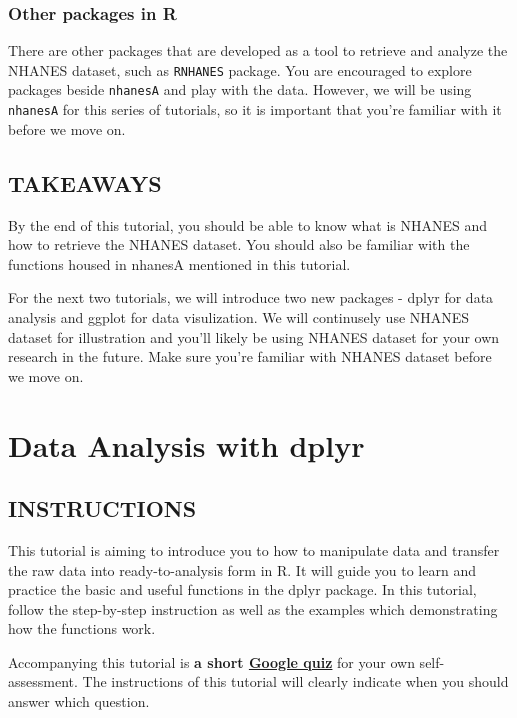 \documentclass[
]{book}
\begin{document}
\hypertarget{other-packages-in-r}{%
\subsection{Other packages in R}\label{other-packages-in-r}}

There are other packages that are developed as a tool to retrieve and analyze the NHANES dataset, such as \texttt{RNHANES} package. You are encouraged to explore packages beside \texttt{nhanesA} and play with the data. However, we will be using \texttt{nhanesA} for this series of tutorials, so it is important that you're familiar with it before we move on.

\hypertarget{takeaways-1}{%
\section{TAKEAWAYS}\label{takeaways-1}}

By the end of this tutorial, you should be able to know what is NHANES and how to retrieve the NHANES dataset. You should also be familiar with the functions housed in nhanesA mentioned in this tutorial.

For the next two tutorials, we will introduce two new packages - dplyr for data analysis and ggplot for data visulization. We will continusely use NHANES dataset for illustration and you'll likely be using NHANES dataset for your own research in the future. Make sure you're familiar with NHANES dataset before we move on.

\hypertarget{data-analysis-with-dplyr}{%
\chapter{Data Analysis with dplyr}\label{data-analysis-with-dplyr}}

\hypertarget{instructions-4}{%
\section{INSTRUCTIONS}\label{instructions-4}}

This tutorial is aiming to introduce you to how to manipulate data and transfer the raw data into ready-to-analysis form in R. It will guide you to learn and practice the basic and useful functions in the dplyr package. In this tutorial, follow the step-by-step instruction as well as the examples which demonstrating how the functions work.

Accompanying this tutorial is \textbf{a short \href{https://forms.gle/17WnX6paHx5U14jx6}{Google quiz}} for your own self-assessment. The instructions of this tutorial will clearly indicate when you should answer which question.
\end{document}
